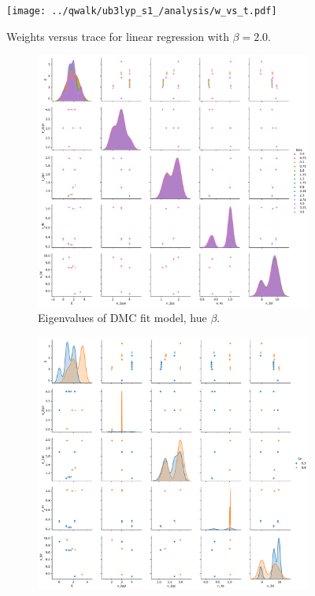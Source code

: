 \documentclass{article}
\begin{document}
\begin{figure}
\texttt{[image: ../qwalk/ub3lyp\_s1\_/analysis/w\_vs\_t.pdf]}
\caption{Weights versus trace for linear regression with $\beta=2.0$.}
\end{figure}

\begin{figure}
\centering
\begin{subfigure}{.5\textwidth}
  \centering
  \includegraphics[width=\linewidth]{../qwalk/ub3lyp_s1_/analysis/beta_dmc_eigenvalues.pdf}
  \caption{Eigenvalues of DMC fit model, hue $\beta$.}
  \label{fig:sub1}
\end{subfigure}%
\begin{subfigure}{.5\textwidth}
  \centering
  \includegraphics[width=\linewidth]{../qwalk/ub3lyp_s1_/analysis/beta_dmc_eigenvalues_sz.pdf}

\end{subfigure}
\end{figure}
\end{document}
